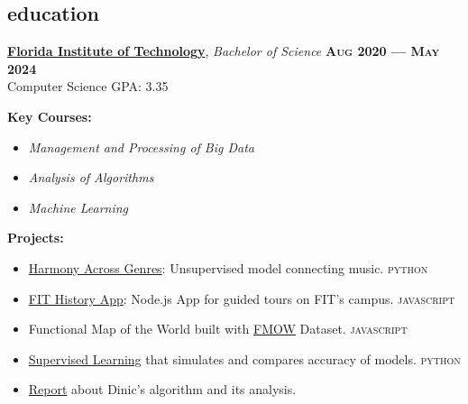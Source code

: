 \documentclass[margin,10pt]{res}
\begin{document}
\begin{resume}

    \section{\sc education}
        \href{https://www.fit.edu/}{\textbf{Florida Institute of Technology}}, \textit{Bachelor of Science}
        \hfill
        \textsc{\bfseries Aug 2020 --- May 2024}
        \\
        Computer Science
        \hfill
        GPA: 3.35
        \vspace{0.5em}
        \begin{description}
            \item[\textbf{Key Courses:}]
        \end{description}
        \begin{itemize}
            \item \textit{Management and Processing of Big Data}
            \item \textit{Analysis of Algorithms}
            \item \textit{Machine Learning}
        \end{itemize}
        \begin{description}
            \item[\textbf{Projects:}]
        \end{description}
        \begin{itemize}
            \item \href{https://github.com/gronk-droid/fit2024spring/blob/trunk/cse4224/projects/project_2/report/project2_report.pdf}{Harmony Across Genres}: Unsupervised model connecting music.
            \hfill
            \textsc{python}
            \item \href{https://github.com/fit-history-app}{FIT History App}: Node.js App for guided tours on FIT's campus.
            \hfill
            \textsc{javascript}
            \item Functional Map of the World built with \href{https://github.com/fmow}{FMOW} Dataset.
            \hfill
            \textsc{javascript}
            \item \href{https://github.com/gronk-droid/fit2024spring/blob/trunk/cse4224/projects/project_1/project_1.ipynb}{Supervised Learning} that simulates and compares accuracy of models.
            \hfill
            \textsc{python}
            \item \href{https://github.com/gronk-droid/cse4081/blob/607f375da2e1c2aedf6d1330a80537ea768698d2/2_group_assignment/docs/report.pdf}{Report} about Dinic's algorithm and its analysis.
            

\end{itemize}
\end{resume}
\end{document}
